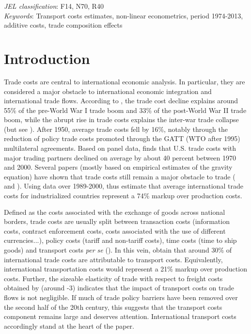 \documentclass[a4paper,11pt]{article}
\begin{document}
\thispagestyle{empty} \pagestyle{plain} \setcounter{page}{1}

\bigskip


\noindent \emph{JEL classification}: F14, N70, R40 \\
\noindent \emph{Keywords}: Transport costs estimates, non-linear econometrics, period 1974-2013, additive costs, trade composition effects

{\normalsize \vspace{0cm} }

{\normalsize \titlepage }

{\normalsize \newpage }


\section{Introduction \label{sec:Intro}}

Trade costs are central to international economic analysis. In particular, they are considered a major obstacle to international economic integration and international trade flows. According to \cite{Jacks08}, the trade cost decline explains around 55\% of the pre-World War I trade boom and 33\% of the post-World War II trade boom, while the abrupt rise in trade costs explains the inter-war trade collapse (but see \cite{corlay_2017}). After 1950, average trade costs fell by 16\%, notably through the reduction of policy trade costs promoted through the GATT (WTO after 1995) multilateral agreements. Based on panel data, \citet{novy13} finds  that U.S. trade costs with major trading partners declined on average by about 40 percent between 1970 and 2000. Several papers (mostly based on empirical estimates of the gravity equation) have shown that trade costs still remain a major obstacle to trade (\citealp{Head_Mayer04} and \citealp{Disdier_Head08}). Using data over 1989-2000, \citet{anderson_wincoop_jel} thus estimate that average international trade costs for industrialized countries represent a 74\% markup over production costs.


Defined as the costs associated with the exchange of goods across national borders, trade costs are usually split between transaction costs (information costs, contract enforcement costs, costs associated with the use of different currencies...), policy costs (tariff  and non-tariff costs), time costs (time to ship goods) and transport costs \emph{per se} (\citet{daudin_logistique_2003, daudin_transactions_2005}). In this vein, \citet{anderson_wincoop_jel} obtain that around 30\% of international trade costs are attributable to transport costs. Equivalently, international transportation costs would represent a 21\% markup over production costs. Further, the sizeable elasticity of trade with respect to freight costs obtained by \cite{Behar_Venables} (around -3) indicates that the impact of transport costs on trade flows is not negligible. If much of trade policy barriers have been removed over the second half of the 20th century, this suggests that the transport costs component remains large and deserves attention. International transport costs accordingly stand at the heart of the paper.\smallskip
\end{document}
